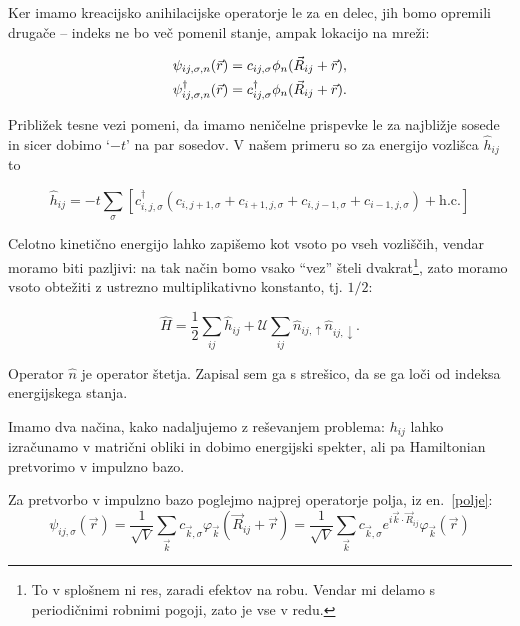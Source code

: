 \documentclass[a4paper, 12pt]{article}
\renewcommand{\u}{
	\ensuremath{\uparrow}
}
\renewcommand{\d}{
	\ensuremath{\downarrow}
}
\newcommand{\hn}{
	\ensuremath{\hat{n}}
}
\newcommand{\oh}{
	\ensuremath{\hat{h}}
}
\renewcommand{\ni}{
	\noindent
}
\begin{document}
\ni Ker imamo kreacijsko anihilacijske operatorje le za en delec, jih bomo opremili druga\v ce -- indeks
ne bo ve\v c pomenil stanje, ampak lokacijo na mre\v zi:

\begin{align}
	\psi_{ij,\sigma,n} (\vec{r}) &= c_{ij,\sigma} \phi_n (\vec{R}_{ij} + \vec{r}), \notag \\
	\psi^\dagger_{ij,\sigma,n} (\vec{r}) &= c^\dagger_{ij,\sigma} \phi_n (\vec{R}_{ij} + \vec{r}).
	\label{polje2}
\end{align}

Pribli\v zek tesne vezi pomeni, da imamo neni\v celne prispevke le za najbli\v zje sosede in sicer
dobimo `$-t$' na par sosedov. V na\v sem
primeru so za energijo vozli\v sca $\oh_{ij}$ to

\begin{equation}
	\oh_{ij} = -t \sum_{\sigma} [c^\dagger_{i,j,\sigma} (c_{i,j+1,\sigma} + c_{i+1,j,\sigma} +
		c_{i,j-1,\sigma} + c_{i-1,j,\sigma}) + \text{h.c.}]
	\label{oh}
\end{equation}

\ni Celotno kineti\v cno energijo lahko zapi\v semo kot vsoto po vseh vozli\v s\v cih, vendar moramo biti
pazljivi: na tak na\v cin bomo vsako "`vez"' \v steli dvakrat\footnote{To v splo\v snem ni res, zaradi
efektov na robu. Vendar mi delamo s periodi\v cnimi robnimi pogoji, zato je vse v redu.}, zato moramo
vsoto obte\v ziti z ustrezno multiplikativno konstanto, tj. $1/2$:

\begin{equation}
	\hat{H} = \frac{1}{2}\sum_{ij} \oh_{ij} + \mathcal{U}\sum_{ij} \hn_{ij,\u} \hn_{ij,\d}.
\end{equation}

\ni Operator $\hn$ je operator \v stetja. Zapisal sem ga s stre\v sico, da se ga lo\v ci od indeksa
energijskega stanja.

Imamo dva na\v cina, kako nadaljujemo z re\v sevanjem problema: $h_{ij}$ lahko izra\v cunamo v
matri\v cni obliki in dobimo energijski spekter, ali pa Hamiltonian pretvorimo v impulzno bazo.

Za pretvorbo v impulzno bazo poglejmo najprej operatorje polja, iz en.~\eqref{polje}:
\begin{equation}
	\psi_{ij,\sigma} (\vec{r}) = \frac{1}{\sqrt{V}}\sum_{\vec{k}}
		c_{\vec{k},\sigma}\varphi_{\vec{k}}(\vec{R}_{ij} + \vec{r}) = 
		\frac{1}{\sqrt{V}}\sum_{\vec{k}} c_{\vec{k},\sigma} e^{i\vec{k}\cdot\vec{R}_{ij}}
		\varphi_{\vec{k}}(\vec{r})
\end{equation}
\end{document}
